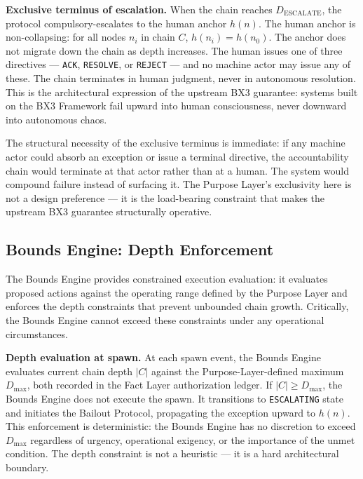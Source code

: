 \medskip
\noindent\textbf{Exclusive terminus of escalation.} When the chain reaches $D_{\mathrm{ESCALATE}}$, the protocol compulsory-escalates to the human anchor $h(n)$. The human anchor is non-collapsing: for all nodes $n_i$ in chain $C$, $h(n_i) = h(n_0)$. The anchor does not migrate down the chain as depth increases. The human issues one of three directives --- \texttt{ACK}, \texttt{RESOLVE}, or \texttt{REJECT} --- and no machine actor may issue any of these. The chain terminates in human judgment, never in autonomous resolution. This is the architectural expression of the upstream BX3 guarantee: systems built on the BX3 Framework fail upward into human consciousness, never downward into autonomous chaos.

The structural necessity of the exclusive terminus is immediate: if any machine actor could absorb an exception or issue a terminal directive, the accountability chain would terminate at that actor rather than at a human. The system would compound failure instead of surfacing it. The Purpose Layer's exclusivity here is not a design preference --- it is the load-bearing constraint that makes the upstream BX3 guarantee structurally operative.

\subsection{Bounds Engine: Depth Enforcement}
\label{sec:rs-bounds-depth}

The Bounds Engine provides constrained execution evaluation: it evaluates proposed actions against the operating range defined by the Purpose Layer and enforces the depth constraints that prevent unbounded chain growth. Critically, the Bounds Engine cannot exceed these constraints under any operational circumstances.

\medskip
\noindent\textbf{Depth evaluation at spawn.} At each spawn event, the Bounds Engine evaluates current chain depth $|C|$ against the Purpose-Layer-defined maximum $D_{\mathrm{max}}$, both recorded in the Fact Layer authorization ledger. If $|C| \geq D_{\mathrm{max}}$, the Bounds Engine does not execute the spawn. It transitions to \texttt{ESCALATING} state and initiates the Bailout Protocol, propagating the exception upward to $h(n)$. This enforcement is deterministic: the Bounds Engine has no discretion to exceed $D_{\mathrm{max}}$ regardless of urgency, operational exigency, or the importance of the unmet condition. The depth constraint is not a heuristic --- it is a hard architectural boundary.

